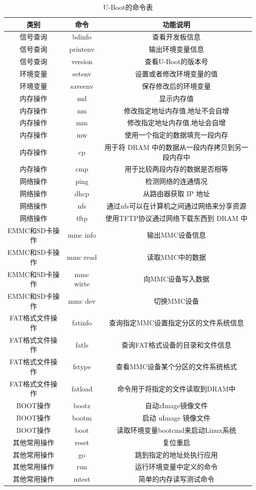    \begin{table}[!ht]
   	\centering
   	\begin{tabular}{|c|c|c|}
   		\hline
   		\textbf{类别} & \textbf{命令} & \textbf{功能说明} \\
   		\hline
   		信号查询 & bdinfo & 查看开发板信息 \\
   		信号查询 & printenv & 输出环境变量信息 \\
   		信号查询 & version & 查看U-Boot的版本号 \\
   		环境变量 & setenv & 设置或者修改环境变量的值 \\
   		环境变量 & saveenv & 保存修改后的环境变量 \\
   		内存操作 & md & 显示内存值\\
   		内存操作 & nm & 修改指定地址内存值,地址不会自增\\
   		内存操作 & mm & 修改指定地址内存值,地址会自增\\
   		内存操作 & mw & 使用一个指定的数据填充一段内存\\
   		内存操作 & cp & 用于将 DRAM 中的数据从一段内存拷贝到另一段内存中\\
   		内存操作 & cmp & 用于比较两段内存的数据是否相等\\
        网络操作 & ping & 检测网络的连通情况 \\
        网络操作 & dhcp & 从路由器获取 IP 地址 \\
        网络操作 & nfs & 通过nfs可以在计算机之间通过网络来分享资源 \\
        网络操作 & tftp & 使用TFTP协议通过网络下载东西到 DRAM 中\\
        EMMC和SD卡操作 & mmc info & 输出MMC设备信息 \\
        EMMC和SD卡操作 & mmc read & 读取MMC中的数据 \\
        EMMC和SD卡操作 & mmc wirte & 向MMC设备写入数据 \\
        EMMC和SD卡操作 & mmc dev & 切换MMC设备 \\
        FAT格式文件操作 & fatinfo & 查询指定MMC设置指定分区的文件系统信息 \\
        FAT格式文件操作 & fatls & 查询FAT格式设备的目录和文件信息 \\
        FAT格式文件操作 & fstype & 查看MMC设备某个分区的文件系统格式 \\
        FAT格式文件操作 & fatload & 命令用于将指定的文件读取到DRAM中 \\
        BOOT操作 & bootz & 自动zImage镜像文件\\
        BOOT操作 & bootm & 启动 uImage 镜像文件 \\
        BOOT操作 & boot& 读取环境变量bootcmd来启动Linux系统 \\
        其他常用操作 & reset & 复位重启 \\
        其他常用操作 & go & 跳到指定的地址处执行应用 \\
        其他常用操作 & run & 运行环境变量中定义的命令 \\
        其他常用操作 & mtest & 简单的内存读写测试命令 \\
   		\hline
   	\end{tabular}
   	\caption{U-Boot的命令表}
   	\label{U-Boot的命令表}
   \end{table}
   
